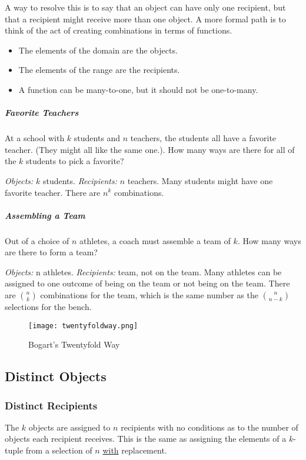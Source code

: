 A way to resolve this is to say that an object can have only one recipient, but that a recipient might receive more than one object. A more formal path is to think of the act of creating combinations in terms of functions. 

\begin{itemize}
\item The elements of the domain are the objects. 
\item The elements of the range are the recipients. 
\item A function can be many-to-one, but it should not be one-to-many. 
\end{itemize}

\subparagraph{Favorite Teachers} At a school with $k$ students and $n$ teachers, the students all have a favorite teacher. (They might all like the same one.). How many ways are there for all of the $k$ students to pick a favorite? 

\textit{Objects:} $k$ students. \textit{Recipients:} $n$ teachers. Many students might have one favorite teacher. There are $n^k$ combinations. 

\subparagraph{Assembling a Team} Out of a choice of $n$ athletes, a coach must assemble a team of $k$. How many ways are there to form a team? 

\textit{Objects:} n athletes. \textit{Recipients:} team, not on the team. Many athletes can be assigned to one outcome of being on the team or not being on the team. There are ${n \choose k}$ combinations for the team, which is the same number as the ${n \choose n-k}$ selections for the bench. 



\begin{figure}
  \caption{Bogart's Twentyfold Way}
  \centering
    \texttt{[image: twentyfoldway.png]}
\end{figure}



\subsection{Distinct Objects}


\subsubsection{Distinct Recipients}
The $k$ objects are assigned to $n$ recipients with no conditions as to the number of objects each recipient receives. This is the same as assigning the elements of a $k$-tuple from a selection of $n$ \underline{with} replacement.

